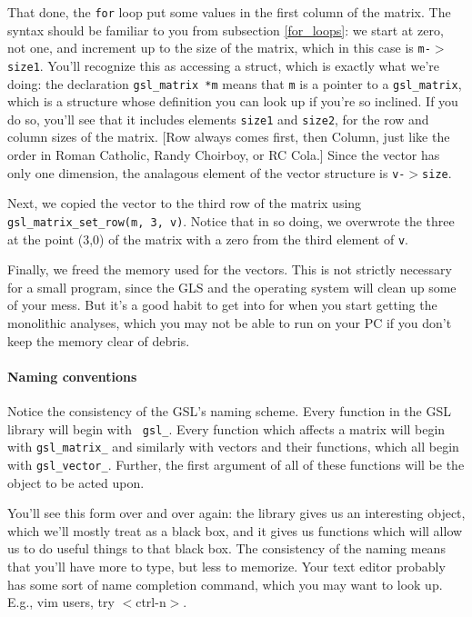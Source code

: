 That done, the {\tt for} loop put some values in the first column of the matrix. 
The syntax should be familiar to you from subsection \ref{for_loops}: we start at
zero, not one, and increment up to the size of the matrix, which in this case is
{\tt m-$>$size1}. You'll recognize this as accessing a struct, which is exactly
what we're doing: the declaration {\tt gsl\_matrix *m} means that {\tt m} is a
pointer to a {\tt gsl\_matrix}, which is a structure whose definition you can
look up if you're so inclined. If you do so, you'll see that it includes 
elements {\tt size1} and {\tt size2}, for the row and column sizes of the
matrix. [Row always comes first, then Column, just like the order in Roman Catholic, 
Randy Choirboy, or RC Cola.] Since the vector has only one dimension, the analagous element
of the vector structure is {\tt v-$>$size}.

Next, we copied the vector to the third row of the matrix using {\tt
gsl\-\_matrix\-\_set\-\_row(m, 3, v)}. Notice that in so doing, we
overwrote the three at the point (3,0) of the matrix with a zero from
the third element of {\tt v}.

Finally, we freed the memory used for the vectors. This is not strictly
necessary for a small program, since the GLS and the operating system
will clean up some of your mess. But it's a good habit to get into for
when you start getting the monolithic analyses, which you may not be
able to run on your PC if you don't keep the memory clear of debris.

\paragraph{Naming conventions}
Notice the consistency of
the GSL's naming scheme. Every function in the GSL library will begin with {\tt
gsl\_}. Every function which affects a matrix will begin with {\tt gsl\_matrix\_}
and similarly with vectors and their functions, which all begin with {\tt gsl\_vector\_}. Further, the
first argument of all of these functions will be the object to be acted upon.

You'll see this form over and over again: the library gives us an interesting
object, which we'll mostly treat as a black box, and it gives us functions which
will allow us to do useful things to that black box. The consistency of the
naming means that you'll have more to type, but less to memorize. Your text
editor probably has some sort of name completion command, which you may want to
look up. E.g., vim users, try $<$ctrl-n$>$.

